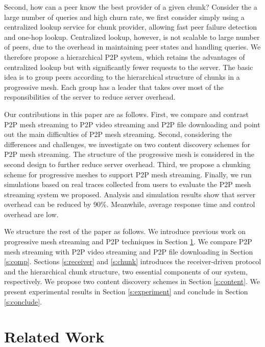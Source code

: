     Second, how can
    a peer know the best provider of a given chunk?   
    Consider the a large number of queries and high churn
    rate, we first consider simply using a 
    centralized lookup service for chunk provider,
    allowing fast peer failure detection and one-hop lookup.
    Centralized lookup, however, is not scalable to large
    number of peers, due to the overhead in maintaining
    peer states and handling queries.
    We therefore propose a hierarchical P2P
    system, which retains the advantages of centralized
    lookup but with significantly fewer 
    requests to the server.  The
    basic idea is to group peers according to the
    hierarchical structure of chunks in a progressive mesh.
    Each group has a leader that takes over most of the responsibilities of the server to
    reduce server overhead.
    
    Our contributions in this paper are as follows.
    First, we compare and contrast P2P mesh streaming to P2P
    video streaming and P2P file downloading and point out
    the main difficulties of P2P mesh streaming.  Second, 
    considering the differences and challenges, 
    we investigate on two content discovery schemes for P2P
    mesh streaming.  The structure of the progressive
    mesh is considered in the second design to further
    reduce server overhead.  Third, we propose a 
    chunking scheme for progressive meshes to support P2P mesh
    streaming.  Finally, we run simulations based on real
    traces collected from users to evaluate the P2P
    mesh streaming system we proposed.  Analysis and
    simulation results show that server overhead can be
    reduced by 90\%. Meanwhile,  average response time and
    control overhead are low.

    We structure the rest of the paper as follows.  We
    introduce previous work on progressive mesh streaming
    and P2P techniques in Section \ref{s:related}.  We
    compare P2P mesh streaming with P2P video streaming and
    P2P file downloading in Section \ref{s:comp}.  
    Sections \ref{s:receiver} and \ref{s:chunk} introduces the
    receiver-driven protocol and the hierarchical chunk structure,
    two essential components of our system, respectively.  We propose two content discovery schemes
    in Section \ref{s:content}.
    We present experimental results in Section
    \ref{s:experiment} and conclude in Section
    \ref{s:conclude}.

\section{Related Work}
\label{s:related}
